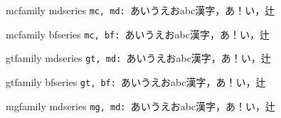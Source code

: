 \documentclass{ltjsarticle}
\begin{document}
\def\r#1#2{ \csname #1family \endcsname \csname #2series \endcsname
  {\tt #1, #2: }あいうえおabc漢字，あ！い，辻
}

\r{mc}{md}

\r{mc}{bf}



\r{gt}{md}

\r{gt}{bf}

\ifdefined\mgfamily
\r{mg}{md}
\fi
\end{document}
